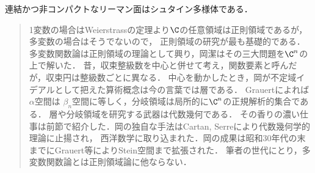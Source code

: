 \documentclass[uplatex, dvipdfmx]{jsreport}
\begin{document}
\begin{theorem}
    連結かつ非コンパクトなリーマン面はシュタイン多様体である．
\end{theorem}

\begin{quotation}
    1変数の場合はWeierstrassの定理より$\C$の任意領域は正則領域であるが，多変数の場合はそうでないので，
    正則領域の研究が最も基礎的である．多変数関数論は正則領域の理論として興り，岡潔はその三大問題を$\C^n$の上で解いた．
    昔，収束整級数を中心と併せて考え，関数要素と呼んだが，収束円は整級数ごとに異なる．
    中心を動かしたとき，岡が不定域イデアルとして把えた算術概念は今の言葉では層である．
    Grauertによれば$\alpha$空間は
    $\beta_n$空間に等しく，分岐領域は局所的に$\C^n$の正規解析的集合である．
    層や分岐領域を研究する武器は代数幾何である．
    その香りの濃い仕事は前節で紹介した．岡の独自な手法はCartan, Serreにより代数幾何学的理論に止揚され，
    西洋数学に取り込まれた．岡の成果は昭和30年代の末までにGrauert等によりStein空間まで拡張された．
    筆者の世代にとり，多変数関数論とは正則領域論に他ならない．\cite{梶原}
\end{quotation}
\end{document}
